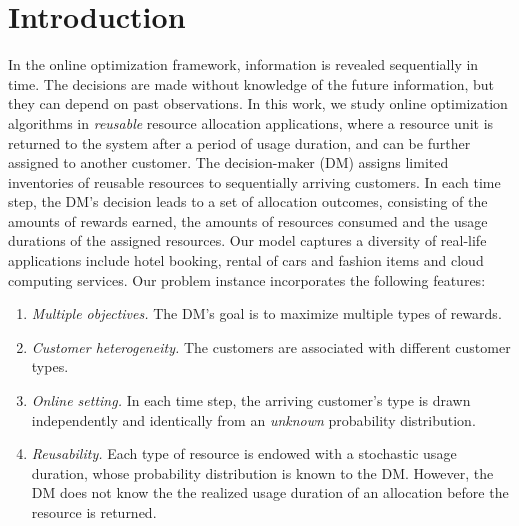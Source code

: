 \documentclass[letterpaper, 10 pt, conference]{ieeeconf}  %
\theoremstyle{plain}
\theoremstyle{definition}
\theoremstyle{remark}
\begin{document}
\section{Introduction}
In the online optimization framework, information is revealed sequentially in time. The decisions are made without knowledge of the future information, but they can depend on past observations. In this work, we study online optimization algorithms in \emph{reusable} resource allocation applications, where a resource unit is returned to the system after a period of usage duration, and can be further assigned to another customer. The decision-maker (DM) assigns limited inventories of reusable resources to sequentially arriving customers. In each time step, the DM's decision leads to a set of allocation outcomes, consisting of the amounts of rewards earned, the amounts of resources consumed and the usage durations of the assigned resources. Our model captures a diversity of real-life applications include hotel booking, rental of cars and fashion items and cloud computing services. Our problem instance incorporates the following features:
\begin{enumerate}
\item \emph{Multiple objectives.} The DM's goal is to maximize multiple types of rewards.
\item \emph{Customer heterogeneity.} The customers are associated with different customer types. 
\item \emph{Online setting.} In each time step, the arriving customer's type is drawn independently and identically from an \emph{unknown} probability distribution.
\item \emph{Reusability.} Each type of resource is endowed with a stochastic usage duration, whose probability distribution is known to the DM. However, the DM does not know the the realized usage duration of an allocation before the resource is returned.
\end{enumerate}
\end{document}
